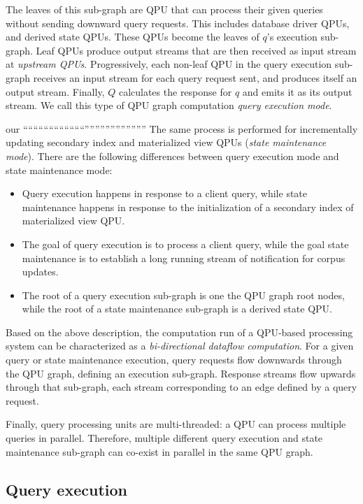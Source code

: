 The leaves of this sub-graph are QPU that can process their given queries without sending downward query requests.
This includes database driver QPUs, and derived state QPUs.
These QPUs become the leaves of $q$'s execution sub-graph.
Leaf QPUs produce output streams that are then received as input stream at \textit{upstream QPUs}.
Progressively, each non-leaf QPU in the query execution sub-graph receives an input stream for each query request sent,
and produces itself an output stream.
Finally, $Q$ calculates the response for $q$ and emits it as its output stream.
We call this type of QPU graph computation \textit{query execution mode}.

\medskip
our ````````````````````````''''''''''''''''''''''''
The same process is performed for incrementally updating secondary index and materialized view QPUs (\textit{state maintenance mode}).
There are the following differences between query execution mode and state maintenance mode:
\begin{itemize}
  \item Query execution happens in response to a client query,
  while state maintenance happens in response to the initialization of a secondary index of materialized view QPU.
  \item The goal of query execution is to process a client query,
  while the goal state maintenance is to establish a long running stream of notification for corpus updates.
  \item The root of a query execution sub-graph is one the QPU graph root nodes,
  while the root of a state maintenance sub-graph is a derived state QPU.
\end{itemize}

\medskip

Based on the above description, the computation run of a QPU-based processing system can be characterized as a
\textit{bi-directional dataflow computation}.
For a given query or state maintenance execution,
query requests flow downwards through the QPU graph, defining an execution sub-graph.
Response streams flow upwards through that sub-graph, each stream corresponding to an edge defined by a query request.

\medskip

Finally, query processing units are multi-threaded:
a QPU can process multiple queries in parallel.
Therefore, multiple different query execution and state maintenance sub-graph can co-exist in parallel in the same QPU
graph.

\subsection{Query execution}


